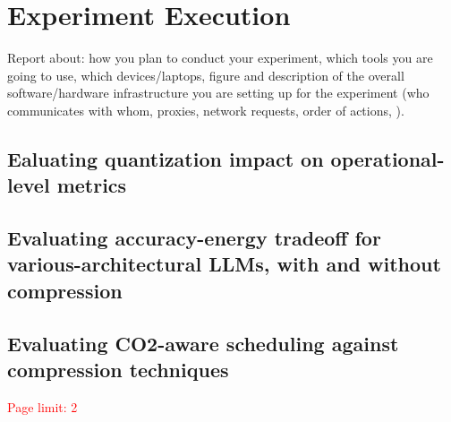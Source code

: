 \section{Experiment Execution}
Report about: how you plan to conduct your experiment, which tools you are going to use, which devices/laptops, figure and description of the overall software/hardware infrastructure you are setting up for the experiment (\eg who communicates with whom, proxies, network requests, order of actions, \etc). 


\subsection{Ealuating quantization impact on operational-level metrics}\label{sec:experiments:operational-level} \label{sec:exp1}

\subsection{Evaluating accuracy-energy tradeoff for various-architectural LLMs, with and without compression}\label{sec:experiments:accuracy-energy} \label{sec:exp2}

\subsection{Evaluating CO2-aware scheduling against compression techniques}\label{sec:experiments:co2-aware} \label{sec:exp3}


\textcolor{red}{Page limit: 2}

